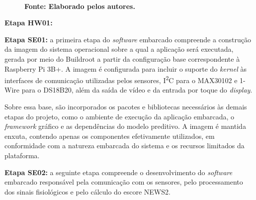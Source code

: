 \begin{figure}[ht]
\\
	\textbf{\footnotesize Fonte: Elaborado pelos autores.}
\end{figure}

\textbf{Etapa HW01:}

\textbf{Etapa SE01:} a primeira etapa do \textit{software} embarcado compreende a construção da imagem do sistema operacional sobre a qual a aplicação será executada, gerada por meio do Buildroot a partir da configuração base correspondente à Raspberry Pi 3B+. A imagem é configurada para incluir o suporte do \textit{kernel} às interfaces de comunicação utilizadas pelos sensores, I\textsuperscript{2}C para o MAX30102 e 1-Wire para o DS18B20, além da saída de vídeo e da entrada por toque do \textit{display}.

Sobre essa base, são incorporados os pacotes e bibliotecas necessários às demais etapas do projeto, como o ambiente de execução da aplicação embarcada, o \textit{framework} gráfico e as dependências do modelo preditivo. A imagem é mantida enxuta, contendo apenas os componentes efetivamente utilizados, em conformidade com a natureza embarcada do sistema e os recursos limitados da plataforma.

\textbf{Etapa SE02:} a seguinte etapa compreende o desenvolvimento do \textit{software} embarcado responsável pela comunicação com os sensores, pelo processamento dos sinais fisiológicos e pelo cálculo do escore NEWS2.

